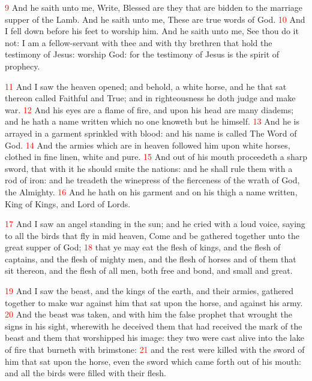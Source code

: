 \documentclass[12pt,twoside]{memoir}
\newcommand{\vnum}[1]{\textcolor{red}{\normalsize{#1}}}
\begin{document}
\vnum{9} And he saith unto me, Write, Blessed are they that are bidden to the marriage supper of the Lamb. And he saith unto me, These are true words of God. 
\vnum{10} And I fell down before his feet to worship him. And he saith unto me, See thou do it not: I am a fellow-servant with thee and with thy brethren that hold the testimony of Jesus: worship God: for the testimony of Jesus is the spirit of prophecy.

\vnum{11} And I saw the heaven opened; and behold, a white horse, and he that sat thereon called Faithful and True; and in righteousness he doth judge and make war. 
\vnum{12} And his eyes are a flame of fire, and upon his head are many diadems; and he hath a name written which no one knoweth but he himself. 
\vnum{13} And he is arrayed in a garment sprinkled with blood: and his name is called The Word of God. 
\vnum{14} And the armies which are in heaven followed him upon white horses, clothed in fine linen, white and pure. 
\vnum{15} And out of his mouth proceedeth a sharp sword, that with it he should smite the nations: and he shall rule them with a rod of iron: and he treadeth the winepress of the fierceness of the wrath of God, the Almighty. 
\vnum{16} And he hath on his garment and on his thigh a name written, King of Kings, and Lord of Lords.

\vnum{17} And I saw an angel standing in the sun; and he cried with a loud voice, saying to all the birds that fly in mid heaven, Come and be gathered together unto the great supper of God; 
\vnum{18} that ye may eat the flesh of kings, and the flesh of captains, and the flesh of mighty men, and the flesh of horses and of them that sit thereon, and the flesh of all men, both free and bond, and small and great.

\vnum{19} And I saw the beast, and the kings of the earth, and their armies, gathered together to make war against him that sat upon the horse, and against his army. 
\vnum{20} And the beast was taken, and with him the false prophet that wrought the signs in his sight, wherewith he deceived them that had received the mark of the beast and them that worshipped his image: they two were cast alive into the lake of fire that burneth with brimstone: 
\vnum{21} and the rest were killed with the sword of him that sat upon the horse, even the sword which came forth out of his mouth: and all the birds were filled with their flesh.

\end{document}
